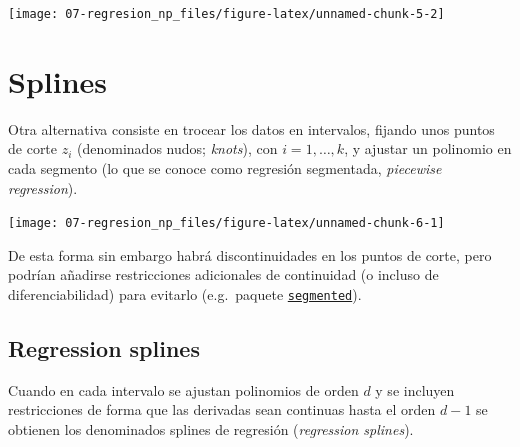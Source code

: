 \documentclass[
  spanish,
]{book}
\newenvironment{Shaded}{\begin{snugshade}}{\end{snugshade}}
\newcommand{\CommentTok}[1]{\textcolor[rgb]{0.56,0.35,0.01}{\textit{#1}}}
\newcommand{\DataTypeTok}[1]{\textcolor[rgb]{0.13,0.29,0.53}{#1}}
\newcommand{\KeywordTok}[1]{\textcolor[rgb]{0.13,0.29,0.53}{\textbf{#1}}}
\newcommand{\NormalTok}[1]{#1}
\newcommand{\OperatorTok}[1]{\textcolor[rgb]{0.81,0.36,0.00}{\textbf{#1}}}
\newcommand{\StringTok}[1]{\textcolor[rgb]{0.31,0.60,0.02}{#1}}
\theoremstyle{break}
\theoremstyle{definition}
\theoremstyle{definition}
\theoremstyle{definition}
\theoremstyle{remark}
\begin{document}
\begin{Shaded}
\end{Shaded}

\begin{center}\texttt{[image: 07-regresion\_np\_files/figure-latex/unnamed-chunk-5-2]} \end{center}

\hypertarget{splines}{%
\section{Splines}\label{splines}}

Otra alternativa consiste en trocear los datos en intervalos, fijando unos puntos de corte \(z_i\) (denominados nudos; \emph{knots}), con \(i = 1, \ldots, k\), y ajustar un polinomio en cada segmento (lo que se conoce como regresión segmentada, \emph{piecewise regression}).

\begin{center}\texttt{[image: 07-regresion\_np\_files/figure-latex/unnamed-chunk-6-1]} \end{center}

De esta forma sin embargo habrá discontinuidades en los puntos de corte, pero podrían añadirse restricciones adicionales de continuidad (o incluso de diferenciabilidad) para evitarlo (e.g.~paquete \href{https://CRAN.R-project.org/package=segmented}{\texttt{segmented}}).

\hypertarget{reg-splines}{%
\subsection{Regression splines}\label{reg-splines}}

Cuando en cada intervalo se ajustan polinomios de orden \(d\) y se incluyen restricciones de forma que las derivadas sean continuas hasta el orden \(d-1\) se obtienen los denominados splines de regresión (\emph{regression splines}).
\end{document}
